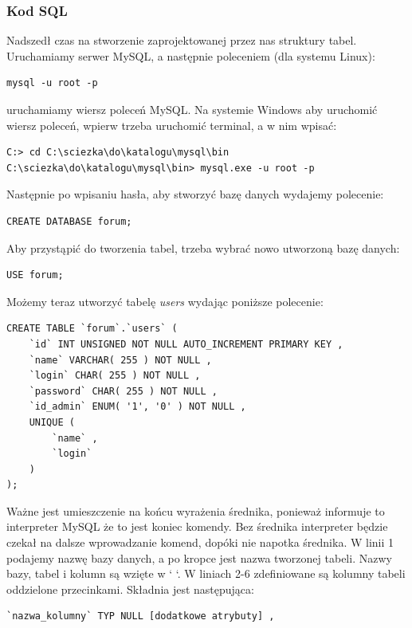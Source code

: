 \documentclass[a4paper,10pt]{article}
\begin{document}
\subsubsection{Kod SQL}
Nadszedł czas na stworzenie zaprojektowanej przez nas struktury tabel. Uruchamiamy serwer MySQL, a następnie poleceniem (dla systemu Linux): \\
\begin{verbatim}
mysql -u root -p
\end{verbatim}
uruchamiamy wiersz poleceń MySQL.
Na systemie Windows aby uruchomić wiersz poleceń, wpierw trzeba uruchomić terminal, a w nim wpisać:  \\
\begin{verbatim}
C:> cd C:\sciezka\do\katalogu\mysql\bin
C:\sciezka\do\katalogu\mysql\bin> mysql.exe -u root -p
\end{verbatim}
Następnie po wpisaniu hasła, aby stworzyć bazę danych wydajemy polecenie: \\
\begin{verbatim}
CREATE DATABASE forum;
\end{verbatim}
Aby przystąpić do tworzenia tabel, trzeba wybrać nowo utworzoną bazę danych: \\
\begin{verbatim}
USE forum;
\end{verbatim}
Możemy teraz utworzyć tabelę \textit{users} wydając poniższe polecenie: \\
\begin{verbatim}
CREATE TABLE `forum`.`users` (
	`id` INT UNSIGNED NOT NULL AUTO_INCREMENT PRIMARY KEY ,
	`name` VARCHAR( 255 ) NOT NULL ,
	`login` CHAR( 255 ) NOT NULL ,
	`password` CHAR( 255 ) NOT NULL ,
	`id_admin` ENUM( '1', '0' ) NOT NULL ,
	UNIQUE (
		`name` ,
		`login` 
	)
);
\end{verbatim}
Ważne jest umieszczenie na końcu wyrażenia średnika, ponieważ informuje to interpreter MySQL że to jest koniec komendy. Bez średnika interpreter będzie czekał na dalsze wprowadzanie komend, dopóki nie napotka średnika.
W linii 1 podajemy nazwę bazy danych, a po kropce jest nazwa tworzonej tabeli. Nazwy bazy, tabel i kolumn są wzięte w ` `. W liniach 2-6 zdefiniowane są kolumny tabeli oddzielone przecinkami. Składnia jest następująca: \\
\begin{verbatim}
`nazwa_kolumny` TYP NULL [dodatkowe atrybuty] ,
\end{verbatim}
\end{document}
